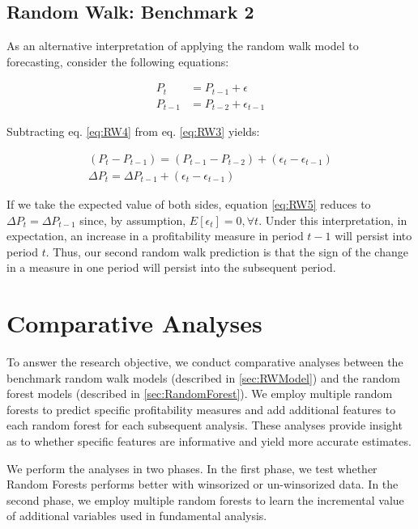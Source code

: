 \subsection{Random Walk: Benchmark 2}

As an alternative interpretation of applying the random walk model to forecasting, consider the following equations:

\begin{align}
	P_t &= P_{t-1} + \epsilon \label{eq:RW3}\\
	P_{t-1} &= P_{t-2} + \epsilon_{t-1} \label{eq:RW4}
\end{align}

\noindent Subtracting eq. \ref{eq:RW4} from eq. \ref{eq:RW3} yields:

\begin{align}
(P_t - P_{t-1}) = (P_{t-1} - P_{t-2}) + (\epsilon_t - \epsilon_{t-1}) \nonumber \\
\Delta P_t = \Delta P_{t-1} + (\epsilon_t - \epsilon_{t-1}) \label{eq:RW5}
\end{align}

If we take the expected value of both sides, equation \ref{eq:RW5} reduces to  \(\Delta P_t = \Delta P_{t-1}\) since, by assumption, \(E[\epsilon_t] = 0, \forall t \). Under this interpretation, in expectation, an increase in a profitability measure in period \(t-1\) will persist into period \(t\). Thus, our second random walk prediction is that the sign of the change in a measure in one period will persist into the subsequent period.


\section{Comparative Analyses} \label{sec:CAnalyses}

To answer the research objective,  we conduct comparative analyses between the benchmark random walk models (described in \ref{sec:RWModel}) and the random forest models (described in \ref{sec:RandomForest}). We employ multiple random forests to predict specific profitability measures and add additional features to each random forest for each subsequent analysis. These analyses provide insight as to whether specific features are informative and yield more accurate estimates.

We perform the analyses in two phases.  In the first phase, we test whether Random Forests performs better with winsorized or un-winsorized data. In the second phase, we employ multiple random forests to learn the incremental value of additional variables used in fundamental analysis. 

